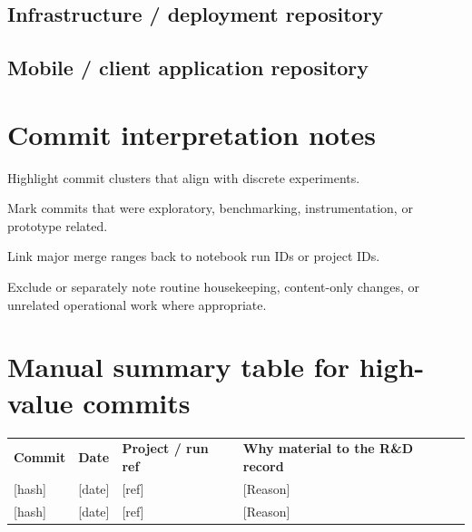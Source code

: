 \documentclass[11pt]{article}
\begin{document}
\subsection{Infrastructure / deployment repository}

\subsection{Mobile / client application repository}

\section{Commit interpretation notes}
\begin{RDChecklist}
\item Highlight commit clusters that align with discrete experiments.
\item Mark commits that were exploratory, benchmarking, instrumentation, or prototype related.
\item Link major merge ranges back to notebook run IDs or project IDs.
\item Exclude or separately note routine housekeeping, content-only changes, or unrelated operational work where appropriate.
\end{RDChecklist}

\section{Manual summary table for high-value commits}
\begin{xltabular}{\textwidth}{L{2.1cm}L{2.2cm}L{2.8cm}Y}
\textbf{Commit} & \textbf{Date} & \textbf{Project / run ref} & \textbf{Why material to the R\&D record} \\
{[hash]} & {[date]} & {[ref]} & {[Reason]} \\
{[hash]} & {[date]} & {[ref]} & {[Reason]} \\
\end{xltabular}

\RDEndMatter
\end{document}
